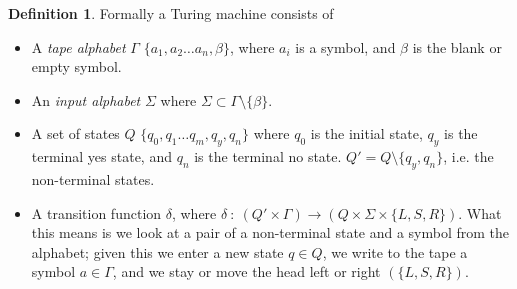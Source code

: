 \documentclass{article}
\theoremstyle{definition}
\newtheorem{definition}{Definition}[section]
\begin{document}
\begin{center}
\end{center}


\begin{definition}
	Formally a Turing machine consists of
	\begin{itemize}
		\item A \textit{tape alphabet} $\Gamma$ $\{a_1, a_2 \dots a_n, \beta\}$,
			where $a_i$ is a symbol, and $\beta$ is the blank or empty symbol.
		\item An \textit{input alphabet} $\Sigma$
			where $\Sigma \subset \Gamma \setminus \{\beta\}$.
		\item A set of states $Q$ $\{q_0, q_1 \dots q_m, q_y, q_n\}$ where $q_0$ is the
			initial state, $q_y$ is the terminal yes state, and $q_n$ is the terminal no state.
			$Q\prime = Q \setminus \{q_y,q_n\}$, i.e. the non-terminal states.
		\item A transition function $\delta$,
			where $\delta\ :\ (Q\prime \times \Gamma) \rightarrow
			(Q \times \Sigma \times \{L,S,R\})$.
			What this means is we look at a pair of a non-terminal state
			and a symbol from the alphabet;
			given this we enter a new state $q \in Q$,
			we write to the tape a symbol $a \in \Gamma$,
			and we stay or move the head left or right $(\{L,S,R\})$.
	\end{itemize}
\end{definition}
\end{document}
